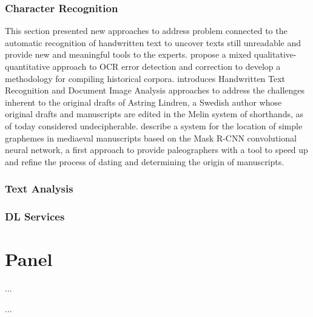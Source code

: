\documentclass[sigconf, nonacm]{acmart}
\begin{document}
\subsubsection*{Character Recognition}
This section presented new approaches to address problem connected to the automatic recognition of handwritten text to uncover texts still unreadable and provide new and meaningful tools to the experts.
\citet{FanteN21} propose a mixed qualitative-quantitative approach to OCR error detection and correction to develop a methodology for compiling historical corpora. 
\citet{HeilNH21} introduces Handwritten Text Recognition and Document Image Analysis approaches to address the challenges inherent to the original drafts of Astring Lindren, a Swedish author whose original drafts and manuscripts are edited in the Melin system of shorthands, as of today considered undecipherable. 
\citet{MarinaiPRS21} describe a system for the location of simple graphemes in mediaeval manuscripts based on the Mask R-CNN convolutional neural network, a first approach to provide paleographers with a tool to speed up and refine the process of dating and determining the origin of manuscripts.

\subsubsection*{Text Analysis}


\subsubsection*{DL Services}



\section{Panel}
...



\begin{acks}
...
\end{acks}



\end{document}
